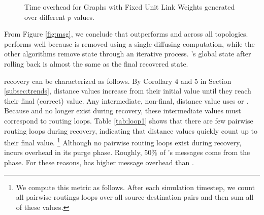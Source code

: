 \begin{figure*}[t]
\centering
{}
\caption{Time overhead for \er Graphs with Fixed Unit Link Weights generated over different $p$ values.}
\label{fig:epoch}
\end{figure*} 




From Figure \ref{fig:msg}, we conclude that \cpr outperforms \purge and \second across all topologies. \cpr performs well because \badvector is removed using a single diffusing computation,  
while the other algorithms remove \badvector state through an iterative process.  \cprs's global state after rolling back is almost the same as the final recovered state.

\second recovery can be characterized as follows.  By Corollary 4 and 5 in Section \ref{subsec:trends}, distance values increase from their initial value until they 
reach their final (correct) value. Any intermediate, non-final, distance value uses \badvector or \oldvectors. Because \badvector and \oldvector no longer exist during recovery,
these intermediate values must correspond to routing loops.
Table \ref{tab:loop1} shows that there are few pairwise routing loops during \second recovery, indicating that \second distance values quickly count up to their final value.
{\footnote {\small We compute this metric as follows. After each simulation timestep, we count all pairwise routings loops over all source-destination pairs and then sum all of these values.}}
Although no pairwise routing loops exist during \purge recovery, \purge incurs overhead in its purge phase.  Roughly, $50\%$ of \purges's messages come from the \purge phase.
For these reasons, \purge has higher message overhead than \seconds.

